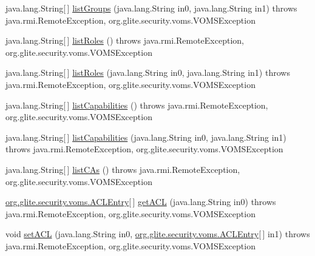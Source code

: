 \begin{DoxyCompactItemize}
\item 
java.lang.String\mbox{[}$\,$\mbox{]} \hyperlink{interfaceorg_1_1glite_1_1security_1_1voms_1_1service_1_1admin_1_1VOMSAdmin_adeac6e344b577d79aeb7053497facc8f}{listGroups} (java.lang.String in0, java.lang.String in1)  throws java.rmi.RemoteException, org.glite.security.voms.VOMSException
\item 
java.lang.String\mbox{[}$\,$\mbox{]} \hyperlink{interfaceorg_1_1glite_1_1security_1_1voms_1_1service_1_1admin_1_1VOMSAdmin_ae30030789ad2ffefe074675c9a2c6597}{listRoles} ()  throws java.rmi.RemoteException, org.glite.security.voms.VOMSException
\item 
java.lang.String\mbox{[}$\,$\mbox{]} \hyperlink{interfaceorg_1_1glite_1_1security_1_1voms_1_1service_1_1admin_1_1VOMSAdmin_a546a643a9bbf549ce8e60c2ec03d30c6}{listRoles} (java.lang.String in0, java.lang.String in1)  throws java.rmi.RemoteException, org.glite.security.voms.VOMSException
\item 
java.lang.String\mbox{[}$\,$\mbox{]} \hyperlink{interfaceorg_1_1glite_1_1security_1_1voms_1_1service_1_1admin_1_1VOMSAdmin_a34f85e3dac9841ee75cd180e76985efb}{listCapabilities} ()  throws java.rmi.RemoteException, org.glite.security.voms.VOMSException
\item 
java.lang.String\mbox{[}$\,$\mbox{]} \hyperlink{interfaceorg_1_1glite_1_1security_1_1voms_1_1service_1_1admin_1_1VOMSAdmin_a2513c2945625c4511311c97bea249050}{listCapabilities} (java.lang.String in0, java.lang.String in1)  throws java.rmi.RemoteException, org.glite.security.voms.VOMSException
\item 
java.lang.String\mbox{[}$\,$\mbox{]} \hyperlink{interfaceorg_1_1glite_1_1security_1_1voms_1_1service_1_1admin_1_1VOMSAdmin_aca6b571c31d7a6b4f1bba9eac8b50f33}{listCAs} ()  throws java.rmi.RemoteException, org.glite.security.voms.VOMSException
\item 
\hyperlink{classorg_1_1glite_1_1security_1_1voms_1_1ACLEntry}{org.glite.security.voms.ACLEntry}\mbox{[}$\,$\mbox{]} \hyperlink{interfaceorg_1_1glite_1_1security_1_1voms_1_1service_1_1admin_1_1VOMSAdmin_ae13dbdb9e42f415cbe2aa7c29e789e98}{getACL} (java.lang.String in0)  throws java.rmi.RemoteException, org.glite.security.voms.VOMSException
\item 
void \hyperlink{interfaceorg_1_1glite_1_1security_1_1voms_1_1service_1_1admin_1_1VOMSAdmin_a8af93a80896770561cb6aa491802d631}{setACL} (java.lang.String in0, \hyperlink{classorg_1_1glite_1_1security_1_1voms_1_1ACLEntry}{org.glite.security.voms.ACLEntry}\mbox{[}$\,$\mbox{]} in1)  throws java.rmi.RemoteException, org.glite.security.voms.VOMSException

\end{DoxyCompactItemize}
